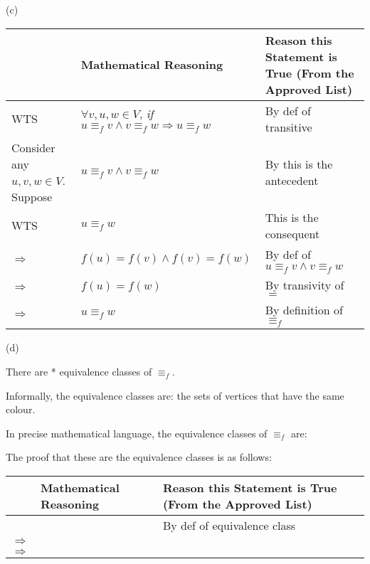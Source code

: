\documentclass{article}
\begin{document}
(c)\vspace{5pt}

\begin{adjustwidth}{-1.5cm}{}
	\begin{tabular}{|p{1.5cm}|p{6.6cm}|p{5.5cm}|}
		\hline
        & \textbf{Mathematical Reasoning} & \textbf{Reason this Statement is True (From the Approved List)} \\
        \hline
		\vspace{1pt}
		WTS & $\forall v,u,w\in V$, \textit{if} $u\equiv_f v\land v\equiv_f w\Rightarrow u\equiv_f w$ & By def of transitive \\
		\hline
		Consider any $u,v,w\in V$. Suppose & $u\equiv_f v\land v\equiv_f w$ & By this is the antecedent \\
		\hline
		WTS & $u\equiv_f w$ & This is the consequent \\
		\hline
		$\Rightarrow$ & $f(u)=f(v)\land f(v)=f(w)$ & By def of $u\equiv_f v\land v\equiv_f w$ \\
		\hline
		$\Rightarrow$ & $f(u)=f(w)$ & By transivity of $=$ \\
		\hline
		$\Rightarrow$ & $u\equiv_f w$ & By definition of $\equiv_f$ \\
		\hline
	\end{tabular}
\end{adjustwidth}
\vspace{15pt}

(d) 

\hspace{0.5cm} There are * equivalence classes of $\equiv_f$. 
\vspace{2pt}

\hspace{0.5cm} Informally, the equivalence classes are: the sets of vertices that have the same colour.
\vspace{2pt}

\hspace{0.5cm} In precise mathematical language, the equivalence classes of $\equiv_f$ are: 
\vspace{5pt}

The proof that these are the equivalence classes is as follows:\vspace{5pt}

\begin{adjustwidth}{-1.5cm}{} 
	\begin{tabular}{|p{1.5cm}|p{6.6cm}|p{5.5cm}|}
		\hline
		& \textbf{Mathematical Reasoning} & \textbf{Reason this Statement is True (From the Approved List)} \\
		\hline
		 & & By def of equivalence class \\
		\hline
		$\Rightarrow$ & & \\
		\hline
		$\Rightarrow$ & & \\
		\hline
	\end{tabular}
\end{adjustwidth}
\end{document}
